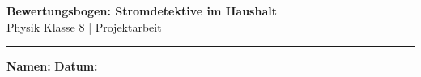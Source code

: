 \documentclass[11pt, a4paper]{article}
\begin{document}

\begin{center}
{\Large\bfseries\textcolor{physik}{Bewertungsbogen: Stromdetektive im Haushalt}}\\[0.5em]
{\normalsize Physik Klasse 8 | Projektarbeit}
\end{center}

\vspace{0.5em}
\hrule
\vspace{1em}

\textbf{Namen:} \underline{\hspace{8cm}} \hfill \textbf{Datum:} \underline{\hspace{3cm}}

\vspace{1em}


\renewcommand{\arraystretch}{1.5}
\end{document}
